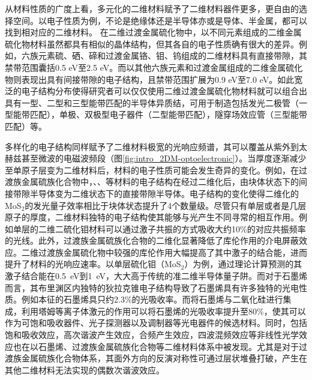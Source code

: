     从材料性质的广度上看，多元化的二维材料赋予了二维材料器件更多，更自由的选择空间。以电子性质为例，不论是绝缘体还是半导体亦或是导体、半金属，都可以找到相对应的二维材料。
    在二维过渡金属硫化物中，以不同元素组成的二维金属硫化物材料虽然都具有相似的晶体结构，但其各自的电子性质确有很大的差异。例如，六族元素硫、硒、碲和过渡金属铬、钼、钨组成的二维材料具有直接带隙，其禁带范围囊括0.5 eV至2.5 eV。而以其他六族元素和过渡金属组成的二维金属硫化物则表现出具有间接带隙的电子结构，且禁带范围扩展为0.9 eV至7.0 eV。如此宽泛的电子结构分布使得研究者可以仅仅使用二维过渡金属硫化物材料就可以组合出具有一型、二型和三型能带匹配的半导体异质结，可用于制造包括发光二极管（一型能带匹配），单极、双极型电子器件（二型能带匹配），隧穿场效应管（三型能带匹配）等。

    多样化的电子结构同样赋予了二维材料极宽的光响应频谱，其可以覆盖从紫外到太赫兹甚至微波的电磁波频段（图\ref{fig:intro_2DM-optoelectronic}）。当厚度逐渐减少至单原子层变为二维材料后，材料的电子性质可能会发生奇异的变化。例如，在过渡族金属硫族化合物中，、、等材料的电子结构在经过二维化后，由块体状态下的间接带隙半导体变为二维状态下的直接带隙半导体。电子结构的变化使得二维化的MoS$_2$的发光量子效率相比于块体状态提升了4个数量级。尽管只有单层或者是几层原子的厚度，二维材料独特的电子结构使其能够与光产生不同寻常的相互作用。例如单层的二维二硫化钼材料可以通过激子共振的方式吸收大约10\%的对应共振频率的光线。此外，过渡族金属硫族化合物的二维化显著降低了库伦作用的介电屏蔽效应。二维过渡族金属硫化物中较强的库伦作用大幅提高了其中激子的结合能，进而提升了材料的光响应速率。以单层硫化钼（MoS$_2$）为例，通过理论计算预测的其激子结合能在\SI{0.5}{\electronvolt}到\SI{1}{\electronvolt}，大大高于传统的准二维半导体量子阱。而对于石墨烯而言，其布里渊区内独特的狄拉克锥电子结构导致了石墨烯具有许多独特的光电性质。例如本征的石墨烯具只约2.3\%的光吸收率。而将石墨烯与二氧化硅进行集成，利用塔姆等离子体激元的作用可以将石墨烯的光吸收率提升至80\%，使其可以作为可饱和吸收器件、光子探测器以及调制器等光电器件的候选材料。同时，包括饱和吸收效应，高次谐波产生效应，合频产生效应，四波混频效应等非线性光学效应也在以石墨烯、过渡族金属硫族化合物等二维材料体系中被发现。尤其是对于过渡族金属硫族化合物体系，其面外方向的反演对称性可通过层状堆叠打破，产生在其他二维材料无法实现的偶数次谐波效应。
    
